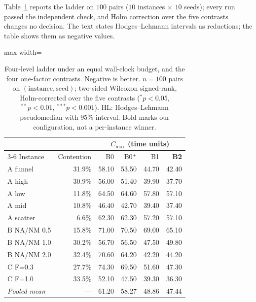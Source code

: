 \documentclass[preprint,review,12pt,authoryear,doubleblind]{elsarticle}
\newcommand{\NCases}{10}
\newcommand{\NSeeds}{10}
\newcommand{\NPairs}{100}
\begin{document}
Table~\ref{tab:main} reports the ladder on $\NPairs$ pairs ($\NCases$ instances $\times$ $\NSeeds$ seeds); every run passed the independent check, and Holm correction over the five contrasts changes no decision.
The text states Hodges--Lehmann intervals as reductions; the table shows them as negative values.

\begin{table}[!htbp]
\caption{Four-level ladder under an equal wall-clock budget, and the four one-factor contrasts. Negative is better.
$n=\NPairs$ pairs on $(\text{instance},\text{seed})$; two-sided Wilcoxon signed-rank, Holm-corrected over the five contrasts
($^{*}p<0.05$, $^{**}p<0.01$, $^{***}p<0.001$). HL: Hodges--Lehmann pseudomedian with $95\%$ interval.
Bold marks our configuration, not a per-instance winner.}
\label{tab:main}
\small
\begin{adjustbox}{max width=\linewidth}\begin{tabular}{@{}lrrrrr@{}}
\toprule
& & \multicolumn{4}{c}{$C_{\max}$ (time units)} \\
\cmidrule(lr){3-6}
Instance & Contention & B0 & B0$^{+}$ & B1 & \textbf{B2} \\
\midrule
A funnel & 31.9\% & 58.10 & 53.50 & 44.70 & 42.40 \\
A high & 30.9\% & 56.00 & 51.40 & 39.90 & 37.70 \\
A low & 11.8\% & 64.50 & 64.60 & 57.80 & 57.10 \\
A mid & 10.8\% & 46.40 & 42.70 & 39.40 & 37.40 \\
A scatter & 6.6\% & 62.30 & 62.30 & 57.20 & 57.10 \\
\midrule
B NA/NM 0.5 & 15.8\% & 71.00 & 70.50 & 69.00 & 65.10 \\
B NA/NM 1.0 & 30.2\% & 56.70 & 56.50 & 47.50 & 49.80 \\
B NA/NM 2.0 & 32.4\% & 70.60 & 64.20 & 42.20 & 44.20 \\
\midrule
C F=0.3 & 27.7\% & 74.30 & 69.50 & 51.60 & 47.30 \\
C F=1.0 & 33.5\% & 52.10 & 47.50 & 39.30 & 36.30 \\
\midrule
\emph{Pooled mean} & --- & 61.20 & 58.27 & 48.86 & 47.44 \\
\bottomrule
\end{tabular}\end{adjustbox}


\end{table}
\end{document}
